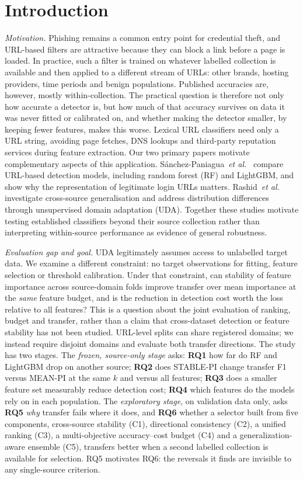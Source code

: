 \section{Introduction}
\textit{Motivation.} Phishing remains a common entry point for credential theft, and URL-based filters are attractive because they can block a link before a page is loaded. In practice, such a filter is trained on whatever labelled collection is available and then applied to a different stream of URLs: other brands, hosting providers, time periods and benign populations. Published accuracies are, however, mostly within-collection. The practical question is therefore not only how accurate a detector is, but how much of that accuracy survives on data it was never fitted or calibrated on, and whether making the detector smaller, by keeping fewer features, makes this worse. Lexical URL classifiers need only a URL string, avoiding page fetches, DNS lookups and third-party reputation services during feature extraction. Our two primary papers motivate complementary aspects of this application. S\'anchez-Paniagua~\textit{et al.}~\cite{sanchez2022} compare URL-based detection models, including random forest (RF) and LightGBM, and show why the representation of legitimate login URLs matters. Rashid~\textit{et al.}~\cite{rashid2024} investigate cross-source generalisation and address distribution differences through unsupervised domain adaptation (UDA). Together these studies motivate testing established classifiers beyond their source collection rather than interpreting within-source performance as evidence of general robustness.

\textit{Evaluation gap and goal.} UDA legitimately assumes access to unlabelled target data. We examine a different constraint: no target observations for fitting, feature selection or threshold calibration. Under that constraint, can stability of feature importance across source-domain folds improve transfer over mean importance at the \emph{same} feature budget, and is the reduction in detection cost worth the loss relative to all features? This is a question about the joint evaluation of ranking, budget and transfer, rather than a claim that cross-dataset detection or feature stability has not been studied. URL-level splits can share registered domains; we instead require disjoint domains and evaluate both transfer directions. The study has two stages. The \emph{frozen, source-only stage} asks: \textbf{RQ1} how far do RF and LightGBM drop on another source; \textbf{RQ2} does STABLE-PI change transfer F1 versus MEAN-PI at the same $k$ and versus all features; \textbf{RQ3} does a smaller feature set measurably reduce detection cost; \textbf{RQ4} which features do the models rely on in each population. The \emph{exploratory stage}, on validation data only, asks \textbf{RQ5} \emph{why} transfer fails where it does, and \textbf{RQ6} whether a selector built from five components, cross-source stability (C1), directional consistency (C2), a unified ranking (C3), a multi-objective accuracy--cost budget (C4) and a generalization-aware ensemble (C5), transfers better when a second labelled collection is available for selection. RQ5 motivates RQ6: the reversals it finds are invisible to any single-source criterion.

